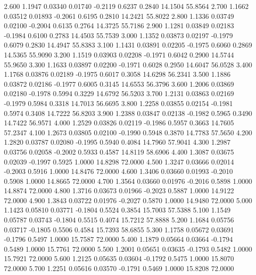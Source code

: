    2.600   1.1947   0.03340   0.01740  -0.2119   0.6237   0.2840  14.1504  55.8564
   2.700   1.1662   0.03512   0.01893  -0.2061   0.6195   0.2810  14.2421  55.8022
   2.800   1.1336   0.03749   0.02100  -0.2004   0.6135   0.2764  14.3725  55.7186
   2.900   1.1281   0.03849   0.02183  -0.1984   0.6100   0.2783  14.4503  55.7539
   3.000   1.1352   0.03873   0.02197  -0.1979   0.6079   0.2830  14.4947  55.8383
   3.100   1.1431   0.03891   0.02205  -0.1975   0.6060   0.2869  14.5365  55.9090
   3.200   1.1519   0.03903   0.02208  -0.1971   0.6042   0.2900  14.5744  55.9650
   3.300   1.1633   0.03897   0.02200  -0.1971   0.6028   0.2950  14.6047  56.0528
   3.400   1.1768   0.03876   0.02189  -0.1975   0.6017   0.3058  14.6298  56.2341
   3.500   1.1886   0.03872   0.02186  -0.1977   0.6005   0.3145  14.6553  56.3796
   3.600   1.2006   0.03869   0.02180  -0.1978   0.5994   0.3229  14.6792  56.5203
   3.700   1.2131   0.03863   0.02169  -0.1979   0.5984   0.3318  14.7013  56.6695
   3.800   1.2258   0.03855   0.02154  -0.1981   0.5974   0.3408  14.7222  56.8203
   3.900   1.2388   0.03847   0.02138  -0.1982   0.5965   0.3490  14.7422  56.9571
   4.000   1.2529   0.03826   0.02119  -0.1986   0.5957   0.3663  14.7605  57.2347
   4.100   1.2673   0.03805   0.02100  -0.1990   0.5948   0.3870  14.7783  57.5650
   4.200   1.2820   0.03787   0.02080  -0.1995   0.5940   0.4084  14.7960  57.9041
   4.300   1.2987   0.03756   0.02058  -0.2002   0.5933   0.4587  14.8119  58.6906
   4.400   1.3087   0.03675   0.02039  -0.1997   0.5925   1.0000  14.8298  72.0000
   4.500   1.3247   0.03666   0.02014  -0.2003   0.5916   1.0000  14.8476  72.0000
   4.600   1.3406   0.03660   0.01993  -0.2010   0.5908   1.0000  14.8665  72.0000
   4.700   1.3564   0.03660   0.01976  -0.2016   0.5898   1.0000  14.8874  72.0000
   4.800   1.3716   0.03673   0.01966  -0.2023   0.5887   1.0000  14.9122  72.0000
   4.900   1.3843   0.03722   0.01976  -0.2027   0.5870   1.0000  14.9480  72.0000
   5.000   1.1423   0.05810   0.03771  -0.1804   0.5524   0.3854  15.7003  57.5388
   5.100   1.1549   0.05787   0.03743  -0.1804   0.5515   0.4074  15.7212  57.8888
   5.200   1.1684   0.05756   0.03717  -0.1805   0.5506   0.4584  15.7393  58.6855
   5.300   1.1758   0.05672   0.03691  -0.1796   0.5497   1.0000  15.7587  72.0000
   5.400   1.1879   0.05664   0.03664  -0.1794   0.5489   1.0000  15.7761  72.0000
   5.500   1.2001   0.05651   0.03635  -0.1793   0.5482   1.0000  15.7921  72.0000
   5.600   1.2125   0.05635   0.03604  -0.1792   0.5475   1.0000  15.8070  72.0000
   5.700   1.2251   0.05616   0.03570  -0.1791   0.5469   1.0000  15.8208  72.0000
